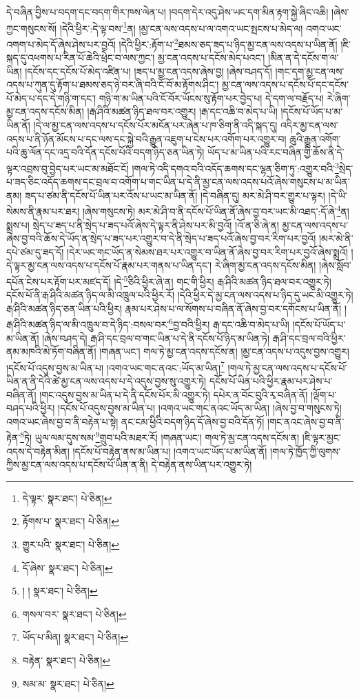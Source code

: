 དེ་བཞིན་བྱིས་པ་བདག་དང་བདག་གིར་ཁས་ལེན་པ། །བདག་དེར་འདུ་ཤེས་ཡང་དག་མིན་རྟག་སྐྱེ་ཞིང་འཆི། །ཞེས་ཀྱང་གསུངས་སོ། །དེའི་ཕྱིར་:དེ་ལྟ་བས་\footnote{དེ་ལྟར་  སྣར་ཐང་།  པེ་ཅིན། }ན། །མྱ་ངན་ལས་འདས་པ་ལ་འགའ་ཡང་སྤངས་པ་མེད་ལ། འགའ་ཡང་འགག་པ་མེད་དོ་ཞེས་ཤེས་པར་བྱའོ། །དེའི་ཕྱིར་:རྟོག་པ་\footnote{རྟོགས་པ་  སྣར་ཐང་།  པེ་ཅིན། }ཐམས་ཅད་ཟད་པ་ཉིད་མྱ་ངན་ལས་འདས་པ་ཡིན་ནོ། །ཇི་སྐད་དུ་འཕགས་པ་རིན་པོ་ཆེའི་ཕྲེང་བ་ལས་ཀྱང་། མྱ་ངན་འདས་པ་དངོས་མེད་པའང་། །མིན་ན་དེ་དངོས་ག་ལ་ཡིན། །དངོས་དང་དངོས་པོ་མེད་འཛིན་པ། །ཟད་པ་མྱ་ངན་འདས་ཞེས་བྱ། །ཞེས་བཤད་དོ། །གང་དག་མྱ་ངན་ལས་འདས་པ་ཀུན་དུ་རྟོག་པ་ཐམས་ཅད་ཉེ་བར་ཞི་བའི་ངོ་བོ་མ་རྟོགས་ཤིང་། མྱ་ངན་ལས་འདས་པ་དངོས་པོ་དང་དངོས་པོ་མེད་པ་དང་དེ་གཉི་ག་དང་། གཉི་ག་མ་ཡིན་པའི་ངོ་བོར་ཡོངས་སུ་རྟོག་པར་བྱེད་པ། དེ་དག་ལ་བརྗོད་པ། རེ་ཞིག་མྱ་ངན་འདས་དངོས་མིན། །རྒ་ཤིའི་མཚན་ཉིད་ཐལ་བར་འགྱུར། །རྒ་དང་འཆི་བ་མེད་པ་ཡི། །དངོས་པོ་ཡོད་པ་མ་ཡིན་ནོ། །དེ་ལ་མྱ་ངན་ལས་འདས་པ་དངོས་པོར་མངོན་པར་ཞེན་པ་ཁ་ཅིག་ནི་འདི་སྐད་དུ། འདིར་མྱ་ངན་ལས་འདས་པ་ནི་ཉོན་མོངས་པ་དང་ལས་དང་སྐྱེ་བའི་རྒྱུན་འཇུག་པ་ངེས་པར་འགོག་པར་འགྱུར་བ། ཆུའི་རྒྱུན་འགོག་པའི་ཆུ་ལོན་དང་འདྲ་བའི་དོན་དངོས་པོའི་བདག་ཉིད་ཅན་ཡིན་ཏེ། ཡོད་པ་མ་ཡིན་པའི་རང་བཞིན་གྱི་ཆོས་ནི་དེ་ལྟར་འབྲས་བུ་བྱེད་པར་ཡང་མ་མཐོང་ངོ། །གལ་ཏེ་འདི་དགའ་བའི་འདོད་ཆགས་དང་ལྷན་ཅིག་ཏུ་:འགྱུར་བའི་\footnote{གྱུར་པའི་  སྣར་ཐང་།  པེ་ཅིན། }སྲེད་པ་ཟད་ཅིང་འདོད་ཆགས་དང་བྲལ་བ་འགོག་པ་གང་ཡིན་པ་དེ་ནི་མྱ་ངན་ལས་འདས་པའོ་ཞེས་གསུངས་པ་མ་ཡིན་ནམ། ཟད་པ་ཙམ་ནི་དངོས་པོ་ཡིན་པར་འོས་པ་ཡང་མ་ཡིན་ནོ། །དེ་བཞིན་དུ། མར་མེ་ཤི་བར་གྱུར་པ་ལྟར། །དེ་ཡི་སེམས་ནི་རྣམ་པར་ཐར། །ཞེས་གསུངས་ཏེ། མར་མེ་ཤི་བ་ནི་དངོས་པོ་ཡིན་ནོ་ཞེས་བྱ་བར་ཡང་མི་འཐད་:དོ་ཞེ་\footnote{དོ་ཞེས་  སྣར་ཐང་།  པེ་ཅིན། }ན། སྨྲས་པ། སྲེད་པ་ཟད་པ་ནི་སྲེད་པ་ཟད་པའོ་ཞེས་དེ་ལྟར་ནི་ཤེས་པར་མི་བྱའོ། །འོ་ན་ཅི་ཞེ་ན། མྱ་ངན་ལས་འདས་པ་ཞེས་བྱ་བའི་ཆོས་དེ་ཡོད་ན་སྲེད་པ་ཟད་པར་འགྱུར་བ་དེ་ནི་སྲེད་པ་ཟད་པའོ་ཞེས་བྱ་བར་རིག་པར་བྱའོ། །མར་མེ་ནི་དཔེ་ཙམ་དུ་ཟད་དོ། །དེར་ཡང་གང་ཡོད་ན་སེམས་ཐར་པར་འགྱུར་བ་ཡིན་ནོ་ཞེས་བྱ་བར་རིག་པར་བྱའོ་ཞེས་སྨྲའོ། །དེ་ལྟར་མྱ་ངན་ལས་འདས་པ་དངོས་པོ་རྣམ་པར་གནས་པ་ཡིན་དང་། རེ་ཞིག་མྱ་ངན་འདས་དངོས་མིན། །ཞེས་སློབ་དཔོན་ངེས་པར་རྟོག་པར་མཛད་དོ། །དེ་\footnote{། །  སྣར་ཐང་།  པེ་ཅིན། }ཅིའི་ཕྱིར་ཞེ་ན། གང་གི་ཕྱིར། རྒ་ཤིའི་མཚན་ཉིད་ཐལ་བར་འགྱུར་ཏེ། དངོས་པོ་ནི་རྒ་ཤིའི་མཚན་ཉིད་ལ་མི་འཁྲུལ་པའི་ཕྱིར་རོ། །དེའི་ཕྱིར་དེ་མྱ་ངན་ལས་འདས་པ་ཉིད་དུ་ཡང་མི་འགྱུར་ཏེ། རྒ་ཤིའི་མཚན་ཉིད་ཅན་ཡིན་པའི་ཕྱིར། རྣམ་པར་ཤེས་པ་ལ་སོགས་པ་བཞིན་ནོ་ཞེས་བྱ་བར་དགོངས་པ་ཡིན་ནོ། །རྒ་ཤིའི་མཚན་ཉིད་ལ་མི་འཁྲུལ་བ་དེ་ཉིད་:བསལ་བར་\footnote{གསལ་བར་  སྣར་ཐང་།  པེ་ཅིན། }བྱ་བའི་ཕྱིར། རྒ་དང་འཆི་བ་མེད་པ་ཡི། །དངོས་པོ་ཡོད་པ་མ་ཡིན་ནོ། །ཞེས་བཤད་དེ། རྒ་ཤི་དང་བྲལ་བ་གང་ཡིན་པ་དེ་ནི་དངོས་པོ་ཉིད་མ་ཡིན་ཏེ། རྒ་ཤི་དང་བྲལ་བའི་ཕྱིར་ནམ་མཁའི་མེ་ཏོག་བཞིན་ནོ། །གཞན་ཡང་། གལ་ཏེ་མྱ་ངན་འདས་དངོས་ན། །མྱ་ངན་འདས་པ་འདུས་བྱས་འགྱུར། །དངོས་པོ་འདུས་བྱས་མ་ཡིན་པ། །འགའ་ཡང་གང་ནའང་:ཡོད་མ་ཡིན།\footnote{ཡོད་པ་མིན།  སྣར་ཐང་།  པེ་ཅིན། } །གལ་ཏེ་མྱ་ངན་ལས་འདས་པ་དངོས་པོ་ཡིན་ན་ནི་དེའི་ཚེ་མྱ་ངན་ལས་འདས་པ་དེ་འདུས་བྱས་སུ་འགྱུར་ཏེ། དངོས་པོ་ཡིན་པའི་ཕྱིར་རྣམ་པར་ཤེས་པ་བཞིན་ནོ། །གང་འདུས་བྱས་མ་ཡིན་པ་དེ་ནི་དངོས་པོར་མི་འགྱུར་ཏེ། དཔེར་ན་བོང་བུའི་རྭ་བཞིན་ནོ། །ལྡོག་པ་བཤད་པའི་ཕྱིར། །དངོས་པོ་འདུས་བྱས་མ་ཡིན་པ། །འགའ་ཡང་གང་ནའང་ཡོད་མ་ཡིན། །ཞེས་བྱ་བ་གསུངས་ཏེ། འགའ་ཡང་ཞེས་བྱ་བ་ནི་བརྟེན་པ་སྟེ། ནང་ངམ་ཕྱིའི་བདག་ཉིད་དོ་ཞེས་བྱ་བའི་དོན་ཏོ། །གང་ནའང་ཞེས་བྱ་བ་ནི་རྟེན་\footnote{བརྟེན་  སྣར་ཐང་།  པེ་ཅིན། }ཏེ། ཡུལ་ལམ་དུས་སམ་\footnote{སམ་མ་  སྣར་ཐང་།  པེ་ཅིན། }གྲུབ་པའི་མཐར་རོ། །གཞན་ཡང་། གལ་ཏེ་མྱ་ངན་འདས་དངོས་ན། །ཇི་ལྟར་མྱང་འདས་དེ་བརྟེན་མིན། །དངོས་པོ་བརྟེན་ནས་མ་ཡིན་པ། །འགའ་ཡང་ཡོད་པ་མ་ཡིན་ནོ། །གལ་ཏེ་ཁྱོད་ཀྱི་ལུགས་ཀྱིས་མྱ་ངན་ལས་འདས་པ་དངོས་པོ་ཡིན་ན་ནི། དེ་བརྟེན་ནས་ཡིན་པར་འགྱུར་ཏེ། 